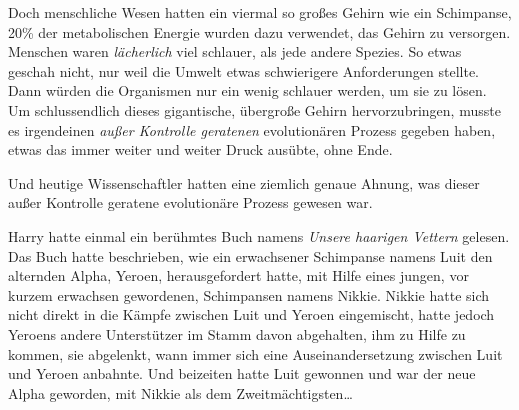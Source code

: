 Doch menschliche Wesen hatten ein viermal so großes Gehirn wie ein Schimpanse, 20\% der metabolischen Energie wurden dazu verwendet, das Gehirn zu versorgen. Menschen waren \emph{lächerlich} viel schlauer, als jede andere Spezies. So etwas geschah nicht, nur weil die Umwelt etwas schwierigere Anforderungen stellte. Dann würden die Organismen nur ein wenig schlauer werden, um sie zu lösen. Um schlussendlich dieses gigantische, übergroße Gehirn hervorzubringen, musste es irgendeinen \emph{außer Kontrolle geratenen} evolutionären Prozess gegeben haben, etwas das immer weiter und weiter Druck ausübte, ohne Ende.

Und heutige Wissenschaftler hatten eine ziemlich genaue Ahnung, was dieser außer Kontrolle geratene evolutionäre Prozess gewesen war.

Harry hatte einmal ein berühmtes Buch namens \emph{Unsere haarigen Vettern} gelesen.%
Das Buch hatte beschrieben, wie ein erwachsener Schimpanse namens Luit den alternden Alpha, Yeroen, herausgefordert hatte, mit Hilfe eines jungen, vor kurzem erwachsen gewordenen, Schimpansen namens Nikkie. Nikkie hatte sich nicht direkt in die Kämpfe zwischen Luit und Yeroen eingemischt, hatte jedoch Yeroens andere Unterstützer im Stamm davon abgehalten, ihm zu Hilfe zu kommen, sie abgelenkt, wann immer sich eine Auseinandersetzung zwischen Luit und Yeroen anbahnte. Und beizeiten hatte Luit gewonnen und war der neue Alpha geworden, mit Nikkie als dem Zweitmächtigsten…

